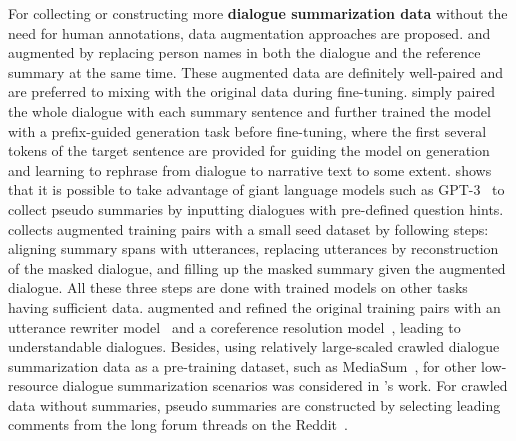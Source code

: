 For collecting or constructing more \textbf{dialogue summarization data} 
without the need for human annotations, data augmentation approaches are 
proposed. \citet{liu2021controllable} and \citet{khalifa2021bag} augmented 
by replacing person names in both the dialogue and the reference summary 
at the same time. These augmented data are definitely well-paired and 
are preferred to mixing with the original data during fine-tuning. 
\citet{jia-etal-2022-post} simply paired the whole dialogue with each summary sentence and further trained the model with a prefix-guided generation task before fine-tuning, where the first several tokens of the target sentence are provided for guiding the model on generation and learning to rephrase from dialogue to narrative text to some extent.
\citet{asi2022end} shows that it is possible to take advantage of giant language models such as GPT-3~\cite{brown2020language} to collect pseudo summaries by inputting dialogues with pre-defined question hints.
\citet{liu2022data} collects augmented training pairs with a small seed dataset by following steps: aligning summary spans with utterances, replacing utterances by reconstruction of the masked dialogue,
and filling up the masked summary given the augmented dialogue. 
All these three steps are done with trained models on other tasks having sufficient data.
\cite{fang2022spoken} augmented and refined the original training pairs with an utterance rewriter model~\cite{liu2020incomplete} and a coreference resolution model~\cite{joshi2020spanbert}, leading to understandable dialogues.
Besides, using relatively large-scaled crawled dialogue summarization data as 
a pre-training dataset, such as MediaSum~\cite{zhu2021mediasum}, 
for other low-resource dialogue summarization scenarios was considered in \citet{zhu2021mediasum}'s work. 
For crawled data without summaries, pseudo summaries are constructed by selecting leading comments from the long forum threads on the Reddit~\cite{yang2022tanet}.




